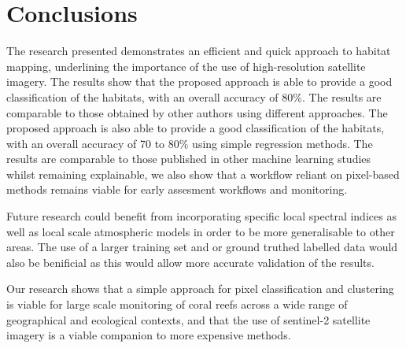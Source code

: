 \documentclass[journal,article,submit,pdftex,moreauthors]{Definitions/mdpi}
\begin{document}
\section{Conclusions}

The research presented demonstrates an efficient and quick approach to habitat mapping, underlining the importance of the use of high-resolution satellite imagery. The results show that the proposed approach is able to provide a good classification of the habitats, with an overall accuracy of 80\%. The results are comparable to those obtained by other authors using different approaches. The proposed approach is also able to provide a good classification of the habitats, with an overall accuracy of 70 to 80\% using simple regression methods. 
The results are comparable to those published in other machine learning studies whilst remaining explainable, we also show that a workflow reliant on pixel-based methods remains viable for early assesment workflows and monitoring.

Future research could benefit from incorporating specific local spectral indices as well as local scale atmospheric models in order to be more generalisable to other areas. The use of a larger training set and or ground truthed labelled data would also be benificial as this would allow more accurate validation of the results. 

Our research shows that a simple approach for pixel classification and clustering is viable for large scale monitoring of coral reefs across a wide range of geographical and ecological contexts, and that the use of sentinel-2 satellite imagery is a viable companion to more expensive methods.


\vspace{6pt} 


\end{document}
